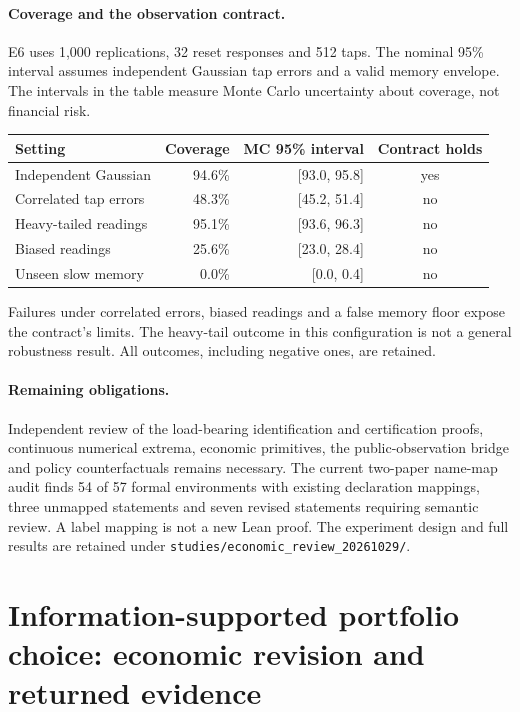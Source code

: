 \paragraph{Coverage and the observation contract.} E6 uses 1,000 replications,
32 reset responses and 512 taps. The nominal 95\% interval assumes independent
Gaussian tap errors and a valid memory envelope. The intervals in the table
measure Monte Carlo uncertainty about coverage, not financial risk.
\begin{center}\small
\begin{tabular}{lrrc}
\toprule
Setting & Coverage & MC 95\% interval & Contract holds\\
\midrule
Independent Gaussian & 94.6\% & [93.0, 95.8] & yes\\
Correlated tap errors & 48.3\% & [45.2, 51.4] & no\\
Heavy-tailed readings & 95.1\% & [93.6, 96.3] & no\\
Biased readings & 25.6\% & [23.0, 28.4] & no\\
Unseen slow memory & 0.0\% & [0.0, 0.4] & no\\
\bottomrule
\end{tabular}
\end{center}
Failures under correlated errors, biased readings and a false memory floor expose
the contract's limits. The heavy-tail outcome in this configuration is not a
general robustness result. All outcomes, including negative ones, are retained.

\paragraph{Remaining obligations.} Independent review of the load-bearing
identification and certification proofs, continuous numerical extrema, economic
primitives, the public-observation bridge and policy counterfactuals remains
necessary. The current two-paper name-map audit finds 54 of 57 formal environments
with existing declaration mappings, three unmapped statements and seven revised
statements requiring semantic review. A label mapping is not a new Lean proof.
The experiment design and full results are retained under
\texttt{studies/economic\_review\_20261029/}.


\section*{Information-supported portfolio choice: economic revision and returned evidence}


